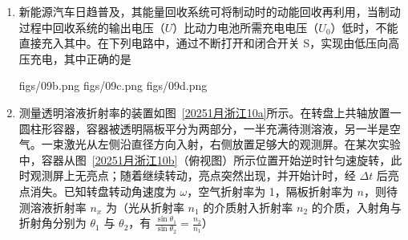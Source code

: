 \documentclass[\gkver]{gaokaozhenti}
\begin{document}
\begin{enumerate}
{即最终三者一起静止，可知经历的时间 $t = \frac{v_{C}}{\mu g} = \frac{2}{0.5 \times 10} \Us = 0.4 \Us$，选项 B 错误；

C．碰撞到三者相对静止摩擦产生的热量 $Q = \frac{1}{2} \times 2mv_{1}^{2} + \frac{1}{2}mv_{C}^{2} = 3 \UJ$。选项 C 错误；

D．碰撞到三者相对静止由能量关系可知 $Q = \mu mgx_{\text{相对}}$ 可得 $x_{\text{相对}} = 0.6 \Um$。选项 D 正确。

故选 D。
}

\item
新能源汽车日趋普及，其能量回收系统可将制动时的动能回收再利用，当制动过程中回收系统的输出电压（$U$）比动力电池所需充电电压（$U_{0}$）低时，不能直接充入其中。在下列电路中，通过不断打开和闭合开关 S，实现由低压向高压充电，其中正确的是

{figs/09b.png}
{figs/09c.png}
{figs/09d.png}


\item
测量透明溶液折射率的装置如图~\ref{20251月浙江10a}所示。在转盘上共轴放置一圆柱形容器，容器被透明隔板平分为两部分，一半充满待测溶液，另一半是空气。一束激光从左侧沿直径方向入射，右侧放置足够大的观测屏。在某次实验中，容器从图~\ref{20251月浙江10b}（俯视图）所示位置开始逆时针匀速旋转，此时观测屏上无亮点；随着继续转动，亮点突然出现，并开始计时，经 $\Delta t$ 后亮点消失。已知转盘转动角速度为 $\omega$，空气折射率为 1，隔板折射率为 $n$，则待测溶液折射率 $n_{x}$ 为（光从折射率 $n_{1}$ 的介质射入折射率 $n_{2}$ 的介质，入射角与折射角分别为 $\theta_{1}$ 与 $\theta_{2}$，有 $\frac{\sin\theta_{1}}{\sin\theta_{2}} = \frac{n_{2}}{n_{1}}$）


\end{enumerate}
\end{document}
